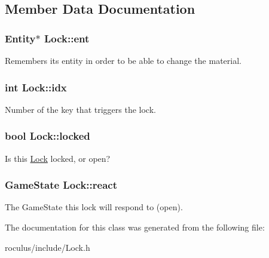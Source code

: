 \subsection{\-Member \-Data \-Documentation}
\hypertarget{classLock_ab92f200ca97e214793f439bfa512159c}{
\subsubsection[{ent}]{\setlength{\rightskip}{0pt plus 5cm}\-Entity$\ast$ {\bf \-Lock\-::ent}}}\label{classLock_ab92f200ca97e214793f439bfa512159c}
\-Remembers its entity in order to be able to change the material. \hypertarget{classLock_a7d5ea9a673fdfc9378bf54633a3c7885}{
\subsubsection[{idx}]{\setlength{\rightskip}{0pt plus 5cm}int {\bf \-Lock\-::idx}}}\label{classLock_a7d5ea9a673fdfc9378bf54633a3c7885}
\-Number of the key that triggers the lock. \hypertarget{classLock_a3f84294da55d52499fe63886b4673d6f}{
\subsubsection[{locked}]{\setlength{\rightskip}{0pt plus 5cm}bool {\bf \-Lock\-::locked}}}\label{classLock_a3f84294da55d52499fe63886b4673d6f}
\-Is this \hyperlink{classLock}{\-Lock} locked, or open? \hypertarget{classLock_aa3796f83850ec610bf5f34ee05b6bdfd}{
\subsubsection[{react}]{\setlength{\rightskip}{0pt plus 5cm}\-Game\-State {\bf \-Lock\-::react}}}\label{classLock_aa3796f83850ec610bf5f34ee05b6bdfd}
\-The \-Game\-State this lock will respond to (open). 

\-The documentation for this class was generated from the following file\-:\begin{DoxyCompactItemize}
\item 
roculus/include/\-Lock.\-h\end{DoxyCompactItemize}
